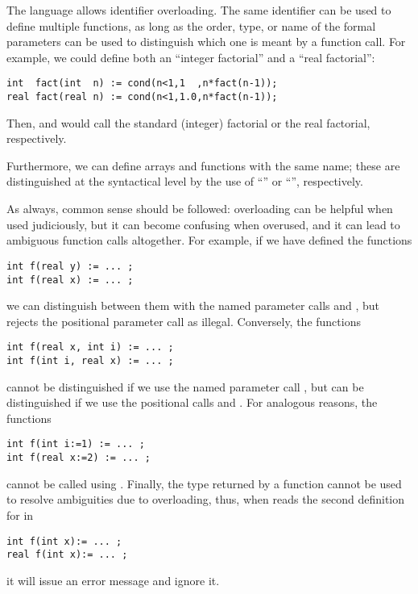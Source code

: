 The {\smart} language allows identifier overloading.
The same identifier can be used to define multiple functions, as long as
the order, type, or name of the formal parameters can be used to
distinguish which one is meant by a function call.  For example, we
could define both an ``integer factorial'' and a ``real factorial'':
\begin{lstlisting}
int  fact(int  n) := cond(n<1,1  ,n*fact(n-1));
real fact(real n) := cond(n<1,1.0,n*fact(n-1));
\end{lstlisting}
Then,  and  would call the standard
(integer) factorial or the real factorial, respectively.

Furthermore, we can define arrays and functions with the same name;
these are distinguished at the syntactical level by the use of
``\Code{[]}'' or ``\Code{()}'', respectively.

As always, common sense should be followed:
overloading can be helpful when used judiciously, but it can become confusing
when overused, and it can lead to ambiguous function calls altogether.
For example, if we have defined the functions
\begin{lstlisting}
int f(real y) := ... ;
int f(real x) := ... ;
\end{lstlisting}
we can distinguish between them with the named parameter calls
 and , but {\smart} rejects the positional
parameter call  as illegal.
Conversely, the functions
\begin{lstlisting}
int f(real x, int i) := ... ;
int f(int i, real x) := ... ;
\end{lstlisting}
cannot be distinguished if we use the named parameter call
, but can be
distinguished if we use the positional calls 
and .
For analogous reasons, the functions
\begin{lstlisting}
int f(int i:=1) := ... ;
int f(real x:=2) := ... ;
\end{lstlisting}
cannot be called using .
Finally, the type returned by a function cannot be used to resolve ambiguities
due to overloading, thus, when {\smart} reads the second definition for 
in
\begin{lstlisting}
int f(int x):= ... ;
real f(int x):= ... ;
\end{lstlisting}
it will issue an error message and ignore it.




